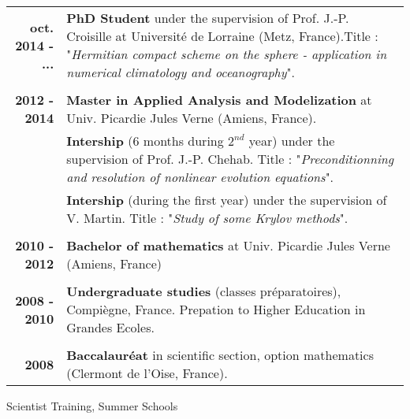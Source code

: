 \documentclass[10pt,a4paper]{report}
\begin{document}
\begin{center}
\begin{tabular}{r p{12cm}}
\textbf{oct. 2014 - ...} & \textbf{PhD Student} under the supervision of Prof. J.-P. Croisille at Université de Lorraine (Metz, France).\newline Title : "\textit{Hermitian compact scheme on the sphere - application in numerical climatology and oceanography}".\\

& \\

\textbf{2012 - 2014} & \textbf{Master in Applied Analysis and Modelization} at Univ. Picardie Jules Verne (Amiens, France). \\

& \textbf{Intership} (6 months during $2^{nd}$ year) under the supervision of Prof. J.-P. Chehab. \newline 
Title : "\textit{Preconditionning and resolution of nonlinear evolution equations}". \\

& \textbf{Intership} (during the first year) under the supervision of V. Martin. \newline 
Title : "\textit{Study of some Krylov methods}". \\

& \\

\textbf{2010 - 2012} & \textbf{Bachelor of mathematics} at Univ. Picardie Jules Verne (Amiens, France) \\

& \\

\textbf{2008 - 2010} & \textbf{Undergraduate studies} (classes préparatoires), Compiègne, France.\newline
Prepation to Higher Education in Grandes Ecoles. \\

& \\

\textbf{2008} & \textbf{Baccalauréat} in scientific section, option mathematics (Clermont de l'Oise, France).\\
\end{tabular}
\end{center}

\vspace{1cm}
\noindent
{\selectfont
\begin{Large}
Scientist Training, Summer Schools
\end{Large}
\hrulefill
}
\end{document}
